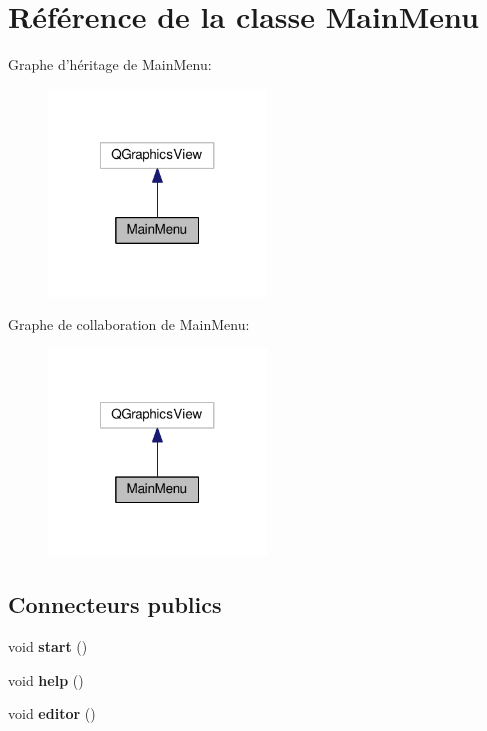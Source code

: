 \hypertarget{classMainMenu}{\section{Référence de la classe Main\+Menu}
\label{classMainMenu}
}


Graphe d'héritage de Main\+Menu\+:
\nopagebreak
\begin{figure}[H]
\begin{center}
\leavevmode
\includegraphics[width=164pt]{db/d55/classMainMenu__inherit__graph}
\end{center}
\end{figure}


Graphe de collaboration de Main\+Menu\+:
\nopagebreak
\begin{figure}[H]
\begin{center}
\leavevmode
\includegraphics[width=164pt]{d8/d60/classMainMenu__coll__graph}
\end{center}
\end{figure}
\subsection*{Connecteurs publics}
\begin{DoxyCompactItemize}
\item 
\hypertarget{classMainMenu_af13a5defbd470cb18edc59d14668aaf4}{void {\bfseries start} ()}\label{classMainMenu_af13a5defbd470cb18edc59d14668aaf4}

\item 
\hypertarget{classMainMenu_aea2e199d621268d691f1aebb7a8f2e31}{void {\bfseries help} ()}\label{classMainMenu_aea2e199d621268d691f1aebb7a8f2e31}

\item 
\hypertarget{classMainMenu_adbce95d3c2192a684d25e6bf2417f073}{void {\bfseries editor} ()}\label{classMainMenu_adbce95d3c2192a684d25e6bf2417f073}

\end{DoxyCompactItemize}

